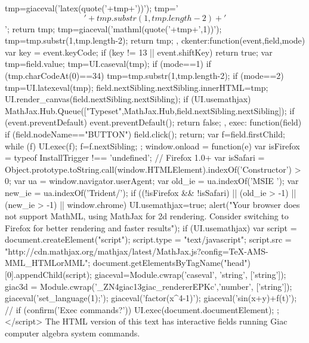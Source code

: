 {{{{{       tmp=giaceval('latex(quote('+tmp+'))');
       tmp='$$'+tmp.substr(1,tmp.length-2)+'$$';
       return tmp;
     }
     tmp=giaceval('mathml(quote('+tmp+',1))');
     tmp=tmp.substr(1,tmp.length-2);
    return tmp;   
  },
  ckenter:function(event,field,mode){
    var key = event.keyCode;
    if (key != 13 || event.shiftKey) return true;
    var tmp=field.value;
    tmp=UI.caseval(tmp);
    if (mode==1){
      if (tmp.charCodeAt(0)==34) tmp=tmp.substr(1,tmp.length-2); 
   }
   if (mode==2){
     tmp=UI.latexeval(tmp);
   }
   field.nextSibling.nextSibling.innerHTML=tmp;
   UI.render_canvas(field.nextSibling.nextSibling);
   if (UI.usemathjax) MathJax.Hub.Queue(["Typeset",MathJax.Hub,field.nextSibling.nextSibling]);
   if (event.preventDefault) event.preventDefault();
    return false;
  },
  exec: function(field){
     if (field.nodeName=="BUTTON"){
        field.click();
        return;
     }
     var f=field.firstChild;
     while (f){
       UI.exec(f);
       f=f.nextSibling;
     }
   }
 };
 window.onload = function(e){
   var isFirefox = typeof InstallTrigger !== 'undefined';   // Firefox 1.0+
   var isSafari = Object.prototype.toString.call(window.HTMLElement).indexOf('Constructor') > 0;
  var ua = window.navigator.userAgent;
  var old_ie = ua.indexOf('MSIE ');
  var new_ie = ua.indexOf('Trident/');
  if ((!isFirefox && !isSafari) || (old_ie > -1) || (new_ie > -1) || window.chrome){
     UI.usemathjax=true;
     alert("Your browser does not support MathML, using MathJax for 2d rendering. Consider switching to Firefox for better rendering and faster results");
  }
  if (UI.usemathjax){
    var script = document.createElement("script");
    script.type = "text/javascript";
    script.src  = "http://cdn.mathjax.org/mathjax/latest/MathJax.js?config=TeX-AMS-MML_HTMLorMML";
    document.getElementsByTagName("head")[0].appendChild(script);
  }
  giaceval=Module.cwrap('caseval',  'string', ['string']);
  giac3d = Module.cwrap('_ZN4giac13giac_rendererEPKc','number', ['string']);
  giaceval('set_language(1);');
  giaceval('factor(x^4-1)');
  giaceval('sin(x+y)+f(t)');
 // if (confirm('Exec commands?')) UI.exec(document.documentElement);
 };
</script>
}
\else
The HTML version of this text has interactive fields running Giac
computer algebra system commands.
\fi
}
\ifhevea
\newenvironment{giacprog}{
\verbatim}
{\endverbatim 
\@print{<button onclick="var field=parentNode.previousSibling; var tmp=field.innerHTML;if(tmp.length==0) tmp=field.value;var t=createElement('TEXTAREA');t.style.fontSize=16;t.cols=60;t.rows=10;t.value=tmp;tmp=UI.caseval(tmp);if (tmp.charCodeAt(0)==34) tmp=tmp.substr(1,tmp.length-2);nextSibling.innerHTML=tmp; UI.render_canvas(nextSibling.innerHTML); field.parentNode.insertBefore(t,field);field.parentNode.removeChild(field);">ok</button><span></span><br>
}
}
\else
\newenvironment{giacprog}
{
\VerbatimEnvironment
\begin{Verbatim}
}
{
\end{Verbatim}
}
\fi

